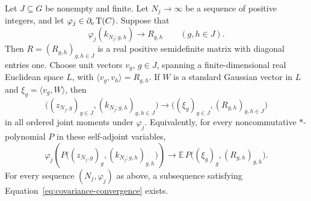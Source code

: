 \begin{proposition}
\label{prop:joint-clt}
Let \(J\subseteq G\) be nonempty and finite. Let \(N_j\to\infty\)
be a sequence of positive integers, and let
\(\varphi_j\in\partial_{\mathrm e}\operatorname{T}(C)\). Suppose that
\begin{equation}
\label{eq:covariance-convergence}
 \varphi_j(k_{N_j;g,h})\longrightarrow R_{g,h}
 \qquad(g,h\in J).
\end{equation}
Then \(R=(R_{g,h})_{g,h\in J}\) is a real positive semidefinite
matrix with diagonal entries one.
Choose unit vectors \(v_g\), \(g\in J\), spanning a
finite-dimensional real Euclidean space \(L\), with
\(\langle v_g,v_h\rangle=R_{g,h}\). If \(W\) is a standard
Gaussian vector in \(L\) and
\(\xi_g=\langle v_g,W\rangle\), then
\[
 \bigl((z_{N_j,g})_{g\in J},(k_{N_j;g,h})_{g,h\in J}\bigr)
 \longrightarrow
 \bigl((\xi_g)_{g\in J},(R_{g,h})_{g,h\in J}\bigr)
\]
in all ordered joint moments under \(\varphi_j\).
Equivalently, for every noncommutative \(*\)-polynomial \(P\)
in these self-adjoint variables,
\begin{equation}
\label{eq:joint-polynomial-limit}
 \varphi_j\!\left(
 P\bigl((z_{N_j,g})_g,(k_{N_j;g,h})_{g,h}\bigr)\right)
 \longrightarrow
 \mathbb E\,P\bigl((\xi_g)_g,(R_{g,h})_{g,h}\bigr).
\end{equation}
For every sequence \((N_j,\varphi_j)\) as above, a subsequence
satisfying Equation~\eqref{eq:covariance-convergence} exists.
\end{proposition}

